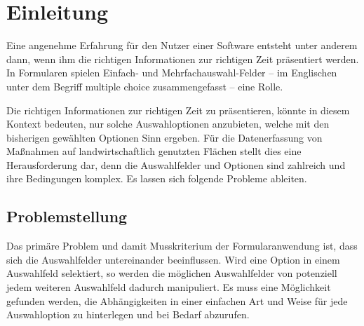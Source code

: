 \chapter{Einleitung}

Eine angenehme Erfahrung für den Nutzer einer Software entsteht unter anderem dann,
wenn ihm die richtigen Informationen zur richtigen Zeit präsentiert werden.
In Formularen spielen Einfach- und Mehrfachauswahl-Felder
-- im Englischen unter dem Begriff multiple choice zusammengefasst -- eine Rolle.



Die richtigen Informationen zur richtigen Zeit zu präsentieren, könnte in diesem Kontext bedeuten,
nur solche Auswahloptionen anzubieten,
welche mit den bisherigen gewählten Optionen Sinn ergeben.
Für die Datenerfassung von Maßnahmen auf landwirtschaftlich genutzten Flächen stellt dies eine Herausforderung dar,
denn die Auswahlfelder und Optionen sind zahlreich und ihre Bedingungen komplex.
Es lassen sich folgende Probleme ableiten. 

\section{Problemstellung}

Das primäre Problem und damit Musskriterium der Formularanwendung ist,
dass sich die Auswahlfelder untereinander beeinflussen.
Wird eine Option in einem Auswahlfeld selektiert,
so werden die möglichen Auswahlfelder von potenziell jedem weiteren Auswahlfeld dadurch manipuliert.
Es muss eine Möglichkeit gefunden werden,
die Abhängigkeiten in einer einfachen Art und Weise für jede Auswahloption zu hinterlegen und bei Bedarf abzurufen.


